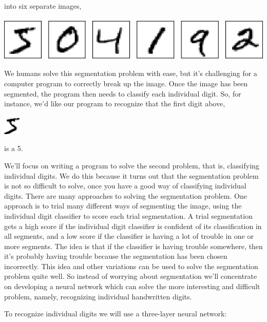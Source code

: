 \documentclass[a4paper,12pt]{report}%
\begin{document}
into six separate images,
\begin{center}
 \includegraphics[width=0.5\linewidth]{images/digits_separate.png}
\end{center}

We humans solve this segmentation problem with ease, but it's challenging for a computer program to correctly break up the image. Once the image has been segmented, the program then needs to classify each individual digit. So, for instance, we'd like our program to recognize that the first digit above,
\begin{center}
 \includegraphics[width=0.05\linewidth]{images/mnist_first_digit.png}
\end{center}
is a 5.

\bigskip

We'll focus on writing a program to solve the second problem, that is, classifying individual digits. We do this because it turns out that the segmentation problem is not so difficult to solve, once you have a good way of classifying individual digits. There are many approaches to solving the segmentation problem. One approach is to trial many different ways of segmenting the image, using the individual digit classifier to score each trial segmentation. A trial segmentation gets a high score if the individual digit classifier is confident of its classification in all segments, and a low score if the classifier is having a lot of trouble in one or more segments. The idea is that if the classifier is having trouble somewhere, then it's probably having trouble because the segmentation has been chosen incorrectly. This idea and other variations can be used to solve the segmentation problem quite well. So instead of worrying about segmentation we'll concentrate on developing a neural network which can solve the more interesting and difficult problem, namely, recognizing individual handwritten digits.

To recognize individual digits we will use a three-layer neural network:
\end{document}
